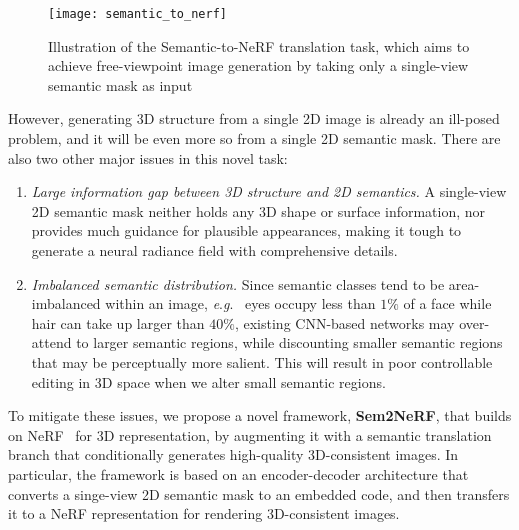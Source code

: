 \documentclass[runningheads]{llncs}
\newcommand{\eg}{\textit{e}.\textit{g}.}
\begin{document}
\begin{figure}[t!]
    \centering
    \texttt{[image: semantic\_to\_nerf]}
    \caption{Illustration of the Semantic-to-NeRF translation task, which aims to achieve free-viewpoint image generation by taking only a single-view semantic mask as input}
    \label{fig:semantic_to_nerf}
\end{figure}

However, generating 3D structure from a single 2D image is already an ill-posed problem, and it will be even more so from a single 2D semantic mask. There are also two other major issues in this novel task:
\begin{enumerate}
    \item \emph{Large information gap between 3D structure and 2D semantics.} A single-view 2D semantic mask neither holds any 3D shape or surface information, nor provides much guidance for plausible appearances, making it tough to generate a neural radiance field with comprehensive details.
    \item \emph{Imbalanced semantic distribution.} Since semantic classes tend to be area-imbalanced within an image, \eg~ eyes occupy less than $1\%$ of a face while hair can take up larger than $40\%$, existing CNN-based networks may over-attend to larger semantic regions, while discounting smaller semantic regions that may be perceptually more salient. This will result in poor controllable editing in 3D space when we alter small semantic regions.
\end{enumerate}
To mitigate these issues, we propose a novel framework, \textbf{Sem2NeRF}, that builds on NeRF~\cite{mildenhall2020nerf} for 3D representation, by augmenting it with a semantic translation branch that conditionally generates high-quality 3D-consistent images. In particular, the framework is based on an encoder-decoder architecture that converts a singe-view 2D semantic mask to an embedded code, and then transfers it to a NeRF representation for rendering  3D-consistent images. 
\end{document}

